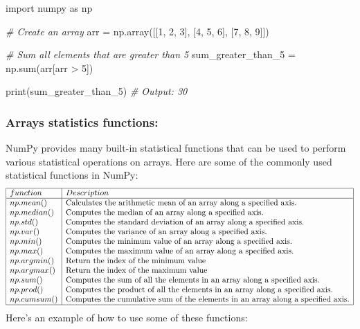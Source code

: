 \documentclass[11pt]{article}
\newenvironment{Shaded}{}{}
\newcommand{\DecValTok}[1]{\textcolor[rgb]{0.25,0.63,0.44}{{#1}}}
\newcommand{\CommentTok}[1]{\textcolor[rgb]{0.38,0.63,0.69}{\textit{{#1}}}}
\newcommand{\NormalTok}[1]{{#1}}
\newcommand{\ImportTok}[1]{{#1}}
\newcommand{\OperatorTok}[1]{\textcolor[rgb]{0.40,0.40,0.40}{{#1}}}
\newcommand{\BuiltInTok}[1]{{#1}}
\begin{document}
\begin{Shaded}
\begin{Highlighting}[]
\ImportTok{import}\NormalTok{ numpy }\ImportTok{as}\NormalTok{ np}

\CommentTok{\# Create an array}
\NormalTok{arr }\OperatorTok{=}\NormalTok{ np.array([[}\DecValTok{1}\NormalTok{, }\DecValTok{2}\NormalTok{, }\DecValTok{3}\NormalTok{], [}\DecValTok{4}\NormalTok{, }\DecValTok{5}\NormalTok{, }\DecValTok{6}\NormalTok{], [}\DecValTok{7}\NormalTok{, }\DecValTok{8}\NormalTok{, }\DecValTok{9}\NormalTok{]])}

\CommentTok{\# Sum all elements that are greater than 5}
\NormalTok{sum\_greater\_than\_5 }\OperatorTok{=}\NormalTok{ np.}\BuiltInTok{sum}\NormalTok{(arr[arr }\OperatorTok{\textgreater{}} \DecValTok{5}\NormalTok{])}

\BuiltInTok{print}\NormalTok{(sum\_greater\_than\_5) }\CommentTok{\# Output: 30}
\end{Highlighting}
\end{Shaded}

\hypertarget{arrays-statistics-functions}{%
\subsubsection{Arrays statistics
functions:}\label{arrays-statistics-functions}}

NumPy provides many built-in statistical functions that can be used to
perform various statistical operations on arrays. Here are some of the
commonly used statistical functions in NumPy:
$$
\begin{array}{|l|l|}
  \hline
function &  Description\\
\hline
np.mean() &\text{Calculates the arithmetic mean of an array along a specified
axis.} \\
np.median() &\text{Computes the median of an array along a specified axis.} \\
np.std() &\text{Computes the standard deviation of an array along a specified
axis.} \\
np.var() &\text{Computes the variance of an array along a specified axis.} \\
np.min() &\text{Computes the minimum value of an array along a specified
axis.} \\
np.max() &\text{Computes the maximum value of an array along a specified
axis.} \\
np.argmin() &\text{Return the index of the minimum value} \\
np.argmax() &\text{Return the index of the maximum value} \\
np.sum() &\text{Computes the sum of all the elements in an array along a
specified axis.} \\
np.prod() &\text{Computes the product of all the elements in an array along a
specified axis.} \\
np.cumsum() &\text{Computes the cumulative sum of the elements in an array
along a specified axis.} \\
\hline
\end{array}
$$
Here's an example of how to use some of these functions:
\end{document}

